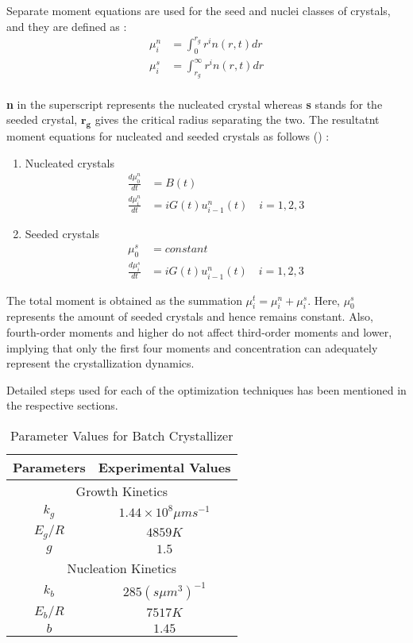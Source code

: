\documentclass[3p,times,authoryear]{elsarticle}
\begin{document}
Separate moment equations are used for the seed and nuclei classes of crystals, and they are defined as : \\
\begin{align}
\mu^{n}_{i} &= \int_{0}^{r_{g}} r^{i}n(r,t) dr \\
\mu^{s}_{i} &= \int_{r_{g}}^{\infty} r^{i}n(r,t) dr
\end{align} \\
\textbf{n} in the superscript represents the nucleated crystal whereas \textbf{s} stands for the seeded crystal, $\boldsymbol{r_{g}}$ gives the critical radius separating the two. The resultatnt moment equations for nucleated and seeded crystals as follows (\cite{yenkie}) :

\begin{enumerate}

\item Nucleated crystals
\begin{align}
\frac{d\mu_{0}^{n}}{dt} &= B(t) \label{g1}\\
\frac{d\mu_{i}^{n}}{dt} &= iG(t)u_{i-1}^{n}(t) \quad  i = 1,2,3
\end{align}

\item Seeded crystals
\begin{align}
\mu_{0}^{s} &= constant \\ \label{seed}
\frac{d\mu_{i}^{s}}{dt} &= iG(t)u_{i-1}^{n}(t) \quad  i = 1,2,3 \label{n1} 
\end{align}
\end{enumerate}
The total moment is obtained as the summation $\mu_{i}^{t} = \mu_{i}^{n} + \mu_{i}^{s}$. Here, $\mu_{0}^{s}$ represents the amount of seeded crystals and hence remains constant. Also, fourth-order moments and higher do not affect third-order moments and lower, implying that only the first four moments and concentration can adequately represent the crystallization dynamics\cite{shi}. 
\par 
Detailed steps used for each of the optimization techniques has been mentioned in the respective sections.
\begin{center}
\begin{table}[!h]
\centering
\caption{Parameter Values for Batch Crystallizer}
\begin{tabular}{|c|c|}
\hline
Parameters & Experimental Values \\
\hline
\multicolumn{2}{|c|}{Growth Kinetics} \\
\hline
$k_{g}$ & $1.44\times10^{8} \mu m s^{-1}$ \\
$E_{g}/R$ & $4859K$ \\
$g$ & $1.5$ \\
\hline
\multicolumn{2}{|c|}{Nucleation Kinetics} \\
\hline
$k_{b}$ & $285 (s \mu m^{3})^{-1}$ \\ 
$E_{b}/R$ & $7517K$ \\
$b$ & $1.45$ \\
\hline
\end{tabular}
\label{Table1}
\end{table}
\end{center}
\end{document}
